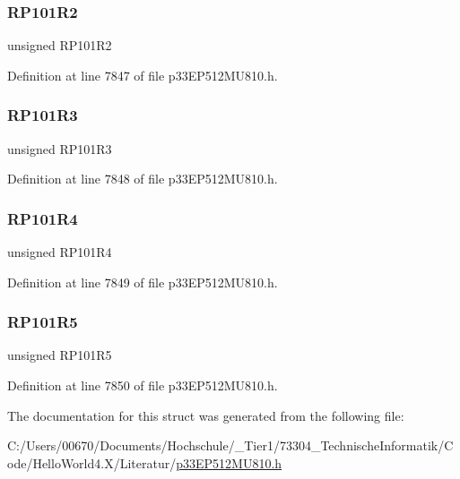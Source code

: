 \subsubsection{\texorpdfstring{R\+P101\+R2}{RP101R2}}
{\footnotesize\ttfamily unsigned R\+P101\+R2}



Definition at line 7847 of file p33\+E\+P512\+M\+U810.\+h.

\mbox{\label{structtag_r_p_o_r9_b_i_t_s_a8f30be2b72d59daa681b6b6133ab12ce}} 
\subsubsection{\texorpdfstring{R\+P101\+R3}{RP101R3}}
{\footnotesize\ttfamily unsigned R\+P101\+R3}



Definition at line 7848 of file p33\+E\+P512\+M\+U810.\+h.

\mbox{\label{structtag_r_p_o_r9_b_i_t_s_ab0738b1cb66d65302ab0868e053a07db}} 
\subsubsection{\texorpdfstring{R\+P101\+R4}{RP101R4}}
{\footnotesize\ttfamily unsigned R\+P101\+R4}



Definition at line 7849 of file p33\+E\+P512\+M\+U810.\+h.

\mbox{\label{structtag_r_p_o_r9_b_i_t_s_a7ca3ccc6bac6c850e9ac7c8b6640b0fb}} 
\subsubsection{\texorpdfstring{R\+P101\+R5}{RP101R5}}
{\footnotesize\ttfamily unsigned R\+P101\+R5}



Definition at line 7850 of file p33\+E\+P512\+M\+U810.\+h.



The documentation for this struct was generated from the following file\+:\begin{DoxyCompactItemize}
\item 
C\+:/\+Users/00670/\+Documents/\+Hochschule/\+\_\+\+Tier1/73304\+\_\+\+Technische\+Informatik/\+Code/\+Hello\+World4.\+X/\+Literatur/\hyperlink{p33_e_p512_m_u810_8h}{p33\+E\+P512\+M\+U810.\+h}\end{DoxyCompactItemize}
